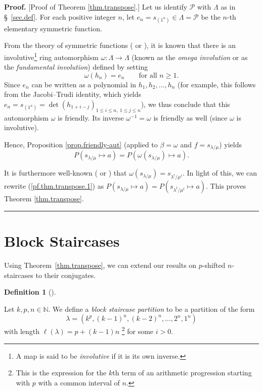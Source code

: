 \documentclass[numbers=enddot,12pt,final,onecolumn,notitlepage]{scrartcl}%
\theoremstyle{definition}
\newtheorem{defi}[theo]{Definition}
\newenvironment{definition}[1][]
{\begin{defi}[#1]\begin{leftbar}}
{\end{leftbar}\end{defi}}
\newenvironment{proof}[1][Proof]{\noindent\textbf{#1.} }{\ \rule{0.5em}{0.5em}}
\newcommand{\NN}{\mathbb{N}}
\renewcommand{\leq}{\leqslant}
\renewcommand{\geq}{\geqslant}
\theoremstyle{plainsl}
\begin{document}
\begin{proof}
[Proof of Theorem \ref{thm.transpose}.] Let us identify $\mathcal{P}$ with
$\Lambda$ as in \S \ \ref{sec.def}. For each positive integer $n$, let
$e_{n}=s_{\left(  1^{n}\right)  }\in\Lambda=\mathcal{P}$ be the $n$-th
elementary symmetric function.

From the theory of symmetric functions (\cite[\S 7.6]{EC2} or \cite[(2.7)]%
{Macdonald}), it is known that there is an involutive\footnote{A map is said
to be \emph{involutive} if it is its own inverse.} ring automorphism
$\omega:\Lambda\rightarrow\Lambda$ (known as the \emph{omega involution} or as
the \emph{fundamental involution}) defined by setting
\[
\omega\left(  h_{n}\right)  =e_{n}\qquad\text{for all }n\geq1.
\]
Since $e_{n}$ can be written as a polynomial in $h_{1},h_{2},\ldots,h_{n}$
(for example, this follows from the Jacobi--Trudi identity, which yields
$e_{n}=s_{\left(  1^{n}\right)  }=\det\left(  h_{1+i-j}\right)  _{1\leq i\leq
n,\ 1\leq j\leq n}$), we thus conclude that this automorphism $\omega$ is
friendly. Its inverse $\omega^{-1}=\omega$ is friendly as well (since $\omega$
is involutive).

Hence, Proposition \ref{prop.friendly-aut} (applied to $\beta=\omega$ and
$f=s_{\lambda/\mu}$) yields%
\begin{equation}
P\left(  s_{\lambda/\mu}\mapsto a\right)  =P\left(  \omega\left(
s_{\lambda/\mu}\right)  \mapsto a\right)  .\label{pf.thm.transpose.1}%
\end{equation}


It is furthermore well-known (\cite[Theorem 7.15.6]{EC2} or \cite[(5.6)]%
{Macdonald}) that $\omega\left(  s_{\lambda/\mu}\right)  =s_{\lambda^{t}%
/\mu^{t}}$. In light of this, we can rewrite (\ref{pf.thm.transpose.1}) as
$P\left(  s_{\lambda/\mu}\mapsto a\right)  =P\left(  s_{\lambda^{t}/\mu^{t}%
}\mapsto a\right)  $. This proves Theorem \ref{thm.transpose}.
\end{proof}


\section{Block Staircases}

Using Theorem~\ref{thm.transpose}, we can extend our results on $p$-shifted $n$-staircases to their conjugates.

\begin{definition}
Let $k,p,n\in \NN$.
We define a \emph{block staircase partition} to be a partition of the form 
\[\lambda = ( k^p, (k-1)^n, (k-2)^n, \ldots,  2^n, 1^n
)
\]
with length $\ell(\lambda) = p+(k-1)n$ \footnote{This is the expression for the $k$th term of an arithmetic progression starting with $p$ with a common interval of $n$. }
for some $i > 0$.
\end{definition}
\end{document}
